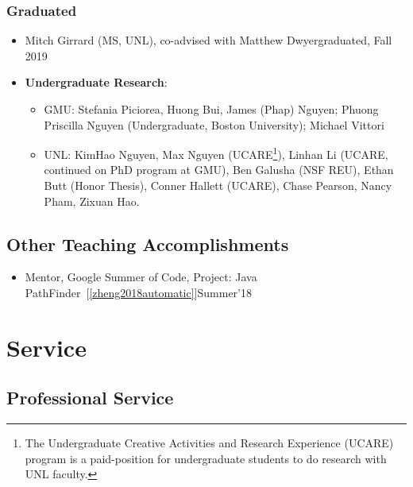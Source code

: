 \documentclass[11pt]{article}
\begin{document}
\subsubsection{Graduated}
\begin{itemize}
    \kimhao{}
    \guolong{}
    \alex{}
    \item Mitch Girrard (MS, UNL), co-advised with Matthew Dwyer\hfill graduated, Fall 2019
    
    \item \textbf{Undergraduate Research}:
    \begin{itemize}
        \item GMU: Stefania Piciorea, Huong Bui, James (Phap) Nguyen; Phuong Priscilla Nguyen (Undergraduate, Boston University); Michael Vittori
        \item UNL: KimHao Nguyen, Max Nguyen (UCARE\footnote{The Undergraduate Creative Activities and Research Experience (UCARE) program is a paid-position for undergraduate students to do research with UNL faculty.}), Linhan Li (UCARE, continued on PhD program at GMU), Ben Galusha (NSF REU), Ethan Butt (Honor Thesis), Conner Hallett (UCARE), Chase Pearson, Nancy Pham, Zixuan Hao.
    \end{itemize}
\end{itemize}


\subsection{Other Teaching Accomplishments}
\begin{itemize}
    \item Mentor, Google Summer of Code, Project: Java PathFinder~[\ref{zheng2018automatic}]\hfill Summer'18
\end{itemize}

\section{Service}
\subsection{Professional Service}
\end{document}
